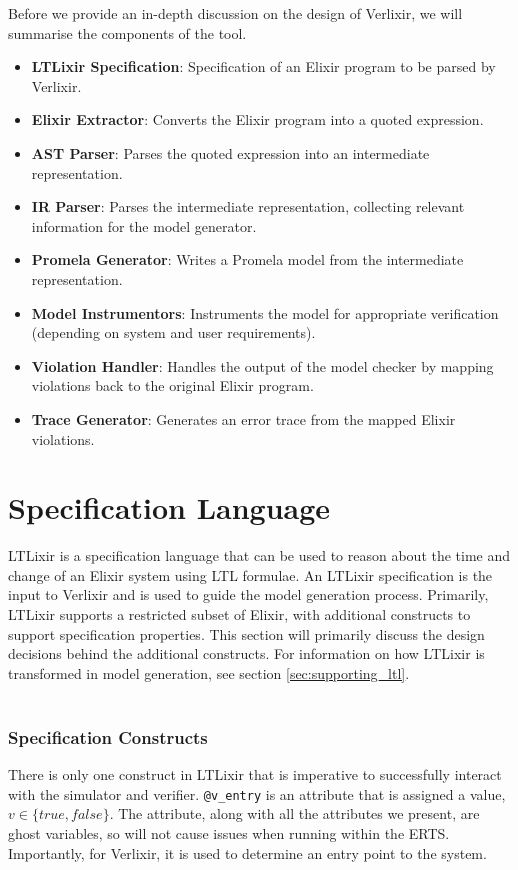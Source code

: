 Before we provide an in-depth discussion on the design of Verlixir, we will summarise the components of the tool.
\begin{itemize}
    \item \textbf{LTLixir Specification}: Specification of an Elixir program to be parsed by Verlixir.
    \item \textbf{Elixir Extractor}: Converts the Elixir program into a quoted expression.
    \item \textbf{AST Parser}: Parses the quoted expression into an intermediate representation.
    \item \textbf{IR Parser}: Parses the intermediate representation, collecting relevant information for the model generator.
    \item \textbf{Promela Generator}: Writes a Promela model from the intermediate representation.
    \item \textbf{Model Instrumentors}: Instruments the model for appropriate verification (depending on system and user requirements).
    \item \textbf{Violation Handler}: Handles the output of the model checker by mapping violations back to the original Elixir program.
    \item \textbf{Trace Generator}: Generates an error trace from the mapped Elixir violations.
\end{itemize}
\section{Specification Language} \label{sec:specification_language}
LTLixir is a specification language that can be used to reason about the time and change of an Elixir system using LTL formulae. An LTLixir specification is the input to Verlixir and is used to guide the model generation process. Primarily, LTLixir supports a restricted subset of Elixir, with additional constructs to support specification properties. This section will primarily discuss the design decisions behind the additional constructs. For information on how LTLixir is transformed in model generation, see section \ref{sec:supporting_ltl}.
\\ \\
\subsubsection{Specification Constructs}
There is only one construct in LTLixir that is imperative to successfully interact with the simulator and verifier. \texttt{@v\_entry} is an attribute that is assigned a value, $v \in \{true, false\}$. The attribute, along with all the attributes we present, are ghost variables, so will not cause issues when running within the ERTS. Importantly, for Verlixir, it is used to determine an entry point to the system.
\\ \\
